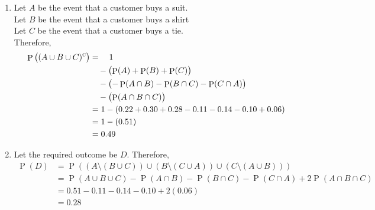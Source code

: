 \documentclass[fleqn, a4paper, 11pt, oneside]{amsart}
\theoremstyle{definition}
\theoremstyle{theorem}
\DeclareMathOperator{\comp}{\textsc{c}}
\DeclareMathOperator{\prob}{\mathrm{P}}
\begin{document}
\begin{solution}
	\begin{enumerate}[leftmargin=*]
		\item
			Let $A$ be the event that a customer buys a suit.\\
			Let $B$ be the event that a customer buys a shirt\\
			Let $C$ be the event that a customer buys a tie.\\
			Therefore,
			\begin{align*}
				\prob\left( (A \cup B \cup C)^{\comp} \right) & = \quad 1                                                                   \\
                                                                              & \quad - \left( \prob(A) + \prob(B) + \prob(C) \right)                       \\
                                                                              & \quad - \left( -\prob(A \cap B) - \prob(B \cap C) - \prob(C \cap A) \right) \\
                                                                              & \quad - \left( \prob(A \cap B \cap C) \right)                               \\
                                                                              & = 1 - (0.22 + 0.30 + 0.28 - 0.11 - 0.14 - 0.10 + 0.06)                      \\
                                                                              & = 1 - (0.51)                                                                \\
                                                                              & = 0.49
			\end{align*}
		\item
			Let the required outcome be $D$.
			Therefore,
			\begin{align*}
				\prob(D) & = \prob\left( \left( A \setminus (B \cup C) \right) \cup \left( B \setminus (C \cup A) \right) \cup \left( C \setminus (A \cup B) \right) \right) \\
                                         & = \prob(A \cup B \cup C) - \prob(A \cap B) - \prob(B \cap C) - \prob(C \cap A) + 2 \prob(A \cap B \cap C)                                         \\
                                         & = 0.51 - 0.11 - 0.14 - 0.10 + 2 (0.06)                                                                                                            \\
                                         & = 0.28
			\end{align*}
	\end{enumerate}
	\begin{figure}[H]
		\centering
\end{figure}
\end{solution}
\end{document}
